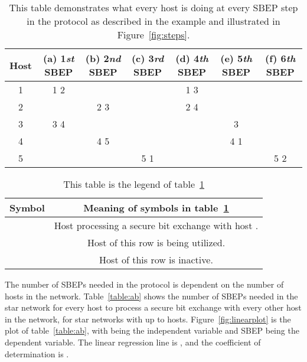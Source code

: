 \documentclass[a4paper,12pt,pdftex]{article}
\begin{document}
\begin{table}[H]
  \begin{center}
    \begin{tabular}{| c | c | c | c | c | c | c |}
    \hline
    Host & (a) 1\textit{st} SBEP & (b) 2\textit{nd} SBEP & (c) 3\textit{rd} SBEP & (d) 4\textit{th} SBEP & (e) 5\textit{th} SBEP & (f) 6\textit{th} SBEP \\
    \hline
     1 & 1  2 &  &  & 1  3 &  &  \\
     \hline
     2 &  & 2  3 &  & 2  4 &  &  \\
     \hline
     3 & 3  4 &  &  &  & 3  &  \\
     \hline
     4 &  & 4  5 &  &  & 4  1 &  \\
     \hline
     5 &  &  & 5  1 &  &  & 5  2 \\
    \hline
    \end{tabular}
  \end{center}
  \caption{This table demonstrates what every host is doing at every SBEP step in the protocol  as described in the example and illustrated in Figure~\ref{fig:steps}.}
  \label{table:steps}
\end{table}

\begin{table}[H]
  \begin{center}
    \begin{tabular}{| c | c |}
    \hline
    Symbol & Meaning of symbols in table~\ref{table:steps}\\
    \hline
     & Host  processing a secure bit exchange with host . \\
    \hline
     & Host of this row is being utilized. \\
    \hline
     & Host of this row is inactive. \\    
    \hline
    \end{tabular}
  \end{center}
  \caption{This table is the legend of table~\ref{table:steps}}
  \label{table:legend}
\end{table}

The number of SBEPs needed in the  protocol is dependent on the number of hosts  in the network. Table~\ref{table:ab} shows the number of SBEPs needed in the star network for every host to process a secure bit exchange with every other host in the network, for star networks with up to  hosts. Figure~\ref{fig:linearplot} is the plot of table~\ref{table:ab}, with  being the independent variable and SBEP being the dependent variable. The linear regression line is , and the coefficient of determination is .
\end{document}
